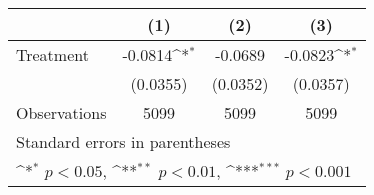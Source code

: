 {
\def\sym#1{\ifmmode^{#1}\else\(^{#1}\)\fi}
\begin{tabular}{l*{3}{c}}
\hline\hline
                    &\multicolumn{1}{c}{(1)}         &\multicolumn{1}{c}{(2)}         &\multicolumn{1}{c}{(3)}         \\
\hline
Treatment           &     -0.0814\sym{*}  &     -0.0689         &     -0.0823\sym{*}  \\
                    &    (0.0355)         &    (0.0352)         &    (0.0357)         \\
\hline
Observations        &        5099         &        5099         &        5099         \\
\hline\hline
\multicolumn{4}{l}{\footnotesize Standard errors in parentheses}\\
\multicolumn{4}{l}{\footnotesize \sym{*} \(p<0.05\), \sym{**} \(p<0.01\), \sym{***} \(p<0.001\)}\\
\end{tabular}
}
